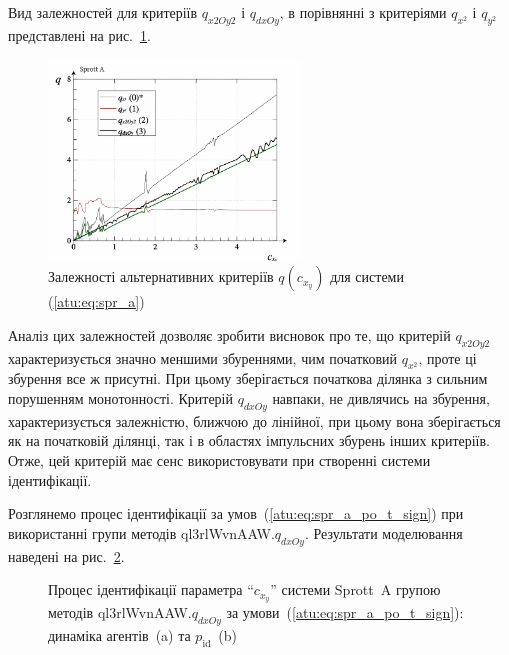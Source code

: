 Вид залежностей для критеріїв
$q_{x2Oy2}$ і
$q_{dxOy}$, в порівнянні з критеріями
$q_{x^2}$ і
$q_{y^2}$ представлені на рис.~\ref{atu:f:spr_a_q_alt}.

\begin{figure}[htb!]
\begin{center}
  \includegraphics[width=0.60\textwidth]{p/cha/spr_a/sprott_a_q2-p_c_x_y2.png}
\end{center}
\caption{Залежності альтернативних критеріїв $q (c_{x_y})$ для системи (\ref{atu:eq:spr_a})}
\label{atu:f:spr_a_q_alt}
\end{figure}

Аналіз цих залежностей дозволяє зробити висновок про те, що
критерій
$q_{x2Oy2}$ характеризується значно меншими збуреннями, чим
початковий
$q_{x^2}$, проте ці збурення все ж присутні. При цьому зберігається
початкова ділянка з сильним порушенням монотонності. Критерій
$q_{dxOy}$ навпаки, не дивлячись на збурення, характеризується
залежністю, ближчою до лінійної, при цьому вона зберігається
як на початковій ділянці, так і в областях імпульсних збурень
інших критеріїв. Отже, цей критерій має сенс використовувати
при створенні системи ідентифікації.

Розглянемо процес ідентифікації за умов~(\ref{atu:eq:spr_a_po_t_sign}) при
використанні групи методів ql3rlWvnAAW.$q_{dxOy}$. Результати моделювання наведені на
рис.~\ref{atu:f:spr_a_id_ql3rlWvnAAW_q_dxOy_sign}.

\begin{figure}[htb!]
  \caption{Процес ідентифікації параметра ``$c_{x_y}$'' системи Sprott~A групою методів ql3rlWvnAAW.$q_{dxOy}$ за умови~(\ref{atu:eq:spr_a_po_t_sign}): динаміка агентів~(a) та $p_\mathrm{id}$~(b)}
  \label{atu:f:spr_a_id_ql3rlWvnAAW_q_dxOy_sign}
\end{figure}

